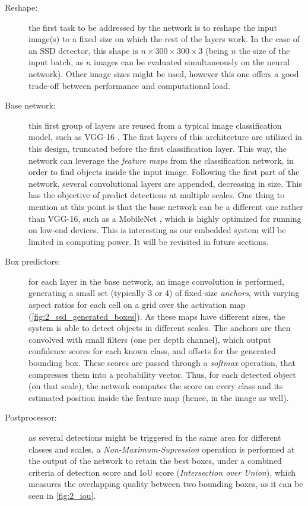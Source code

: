 \begin{description}
	
	\item[Reshape:] the first task to be addressed by the network is to reshape the input image(s) to a fixed size on which the rest of the layers work. In the case of an SSD detector, this shape is $n \times 300 \times 300 \times 3$ (being $n$ the size of the input batch, as $n$ images can be evaluated simultaneously on the neural network). Other image sizes might be used, however this one offers a good trade-off between performance and computational load.
	
	\item [Base network:] this first group of layers are reused from a typical image classification model, such as VGG-16 \cite{vgg16}. The first layers of this architecture are utilized in this design, truncated before the first classification layer. This way, the network can leverage the \textit{feature maps} from the classification network, in order to find objects inside the input image. Following the first part of the network, several convolutional layers are appended, decreasing in size. This has the objective of predict detections at multiple scales. One thing to mention at this point is that the base network can be a different one rather than VGG-16, such as a MobileNet \cite{mobilenet}, which is highly optimized for running on low-end devices. This is interesting as our embedded system will be limited in computing power. It will be revisited in future sections.
	
	\item[Box predictors:] for each layer in the base network, an image  convolution is performed, generating a small set (typically 3 or 4) of fixed-size \textit{anchors}, with varying aspect ratios for each cell on a grid over the activation map (\autoref{fig:2_ssd_generated_boxes}). As these maps have different sizes, the system is able to detect  objects in different scales. The anchors are then convolved with small filters (one per depth channel), which output confidence scores for each known class, and offsets for the generated bounding box. These scores are passed through a \textit{softmax} operation, that compresses them into a probability vector. Thus, for each detected object (on that scale), the network computes the score on every class and its estimated position inside the feature map (hence, in the image as well).
	
	\item [Postprocessor:] as several detections might be triggered in the same area for different classes and scales, a \textit{Non-Maximum-Supression} \cite{nms} operation is performed at the output of the network to retain the best boxes, under a combined criteria of detection score and IoU score (\textit{Intersection over Union}), which measures the overlapping quality between two bounding boxes, as it can be seen in \autoref{fig:2_iou}.
\end{description}


